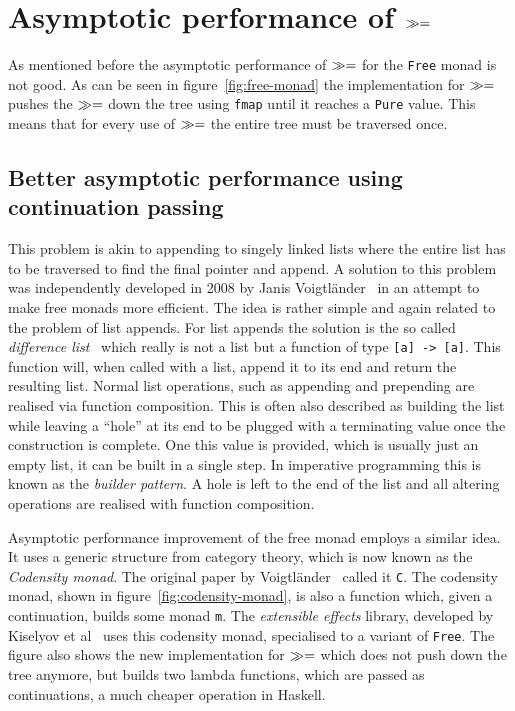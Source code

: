 \section{Asymptotic performance of $\gg=$}

\label{sec:bind-performance}

As mentioned before the asymptotic performance of $\gg=$ for the
\texttt{Free} monad is not good. As can be seen in figure~\ref{fig:free-monad}
the implementation for $\gg=$ pushes the $\gg=$ down the tree using
\texttt{fmap} until it reaches a \texttt{Pure} value. This means that for every
use of $\gg=$ the entire tree must be traversed once.

\subsection{Better asymptotic performance using continuation passing}

\label{sec:performance-with-codensity}

This problem is akin to appending to singely linked lists where the entire list
has to be traversed to find the final pointer and append. A solution to this
problem was independently developed in 2008 by Janis
Voigtländer~\cite{asymptotic-performance-improvement} in an attempt to make free
monads more efficient. The idea is rather simple and again related to the
problem of list appends. For list appends the solution is the so called
\emph{difference list}~\cite{difference-list} which really is not a list but a
function of type \texttt{[a] -> [a]}. This function will, when called with a
list, append it to its end and return the resulting list. Normal list
operations, such as appending and prepending are realised via function
composition. This is often also described as building the list while leaving a
``hole'' at its end to be plugged with a terminating value once the construction
is complete. One this value is provided, which is usually just an empty list, it
can be built in a single step. In imperative programming this is known as the
\emph{builder pattern}. A hole is left to the end of the list and all altering
operations are realised with function composition.

Asymptotic performance improvement of the free monad employs a similar idea. It
uses a generic structure from category theory, which is now known as the
\emph{Codensity monad}. The original paper by
Voigtländer~\cite{asymptotic-performance-improvement} called it \texttt{C}. The
codensity monad, shown in figure~\ref{fig:codensity-monad}, is also a function
which, given a continuation, builds some monad \texttt{m}. The \emph{extensible
  effects} library, developed by Kiselyov et al~\cite{extensible-effects} uses
this codensity monad, specialised to a variant of \texttt{Free}. The figure also
shows the new implementation for $\gg=$ which does not push down the tree
anymore, but builds two lambda functions, which are passed as continuations, a
much cheaper operation in Haskell.

